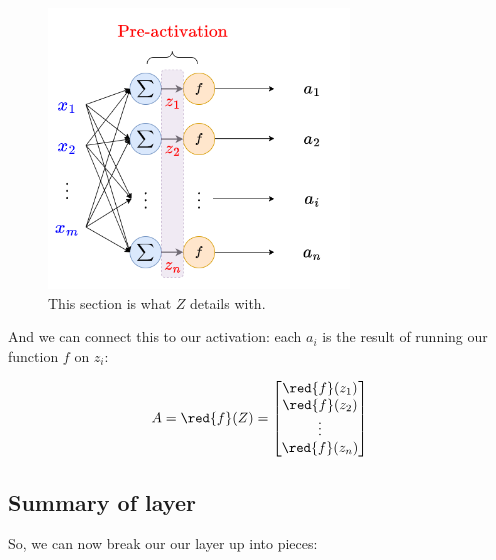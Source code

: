         \begin{figure}[H]
            \centering
            \includegraphics[width=80mm,scale=0.4]{images/nn_images/pre_activation.png}
            \caption*{This section is what $Z$ details with.}
        \end{figure}
        
        And we can connect this to our activation: each $a_i$ is the result of running our function $f$ on $z_i$:
        
        \begin{equation}
            A = 
            \red{f}(Z)=
            \begin{bmatrix}
              \red{f}(z_1) \\ \red{f}(z_2) \\ \vdots \\ \red{f}(z_n)
            \end{bmatrix}
        \end{equation}
        
    \subsection{Summary of layer}
    
        So, we can now break our our layer up into pieces:\\
        
